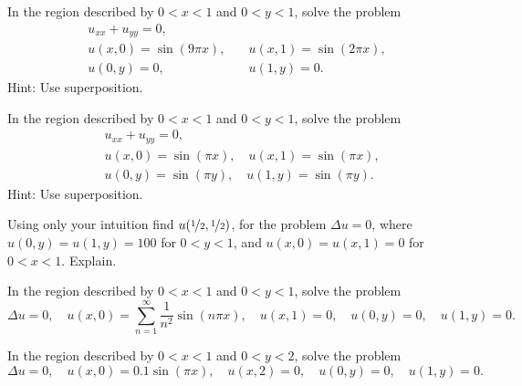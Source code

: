 \begin{exercise}
In the region described by $0 < x < 1$ and $0 < y < 1$,
solve the problem
\begin{equation*}
\begin{array}{ll}
u_{xx} + u_{yy} = 0, & \\
u(x,0) = \sin (9 \pi x), \quad & u(x,1) = \sin (2 \pi x), \\
u(0,y) = 0, \quad & u(1,y) = 0 .
\end{array}
\end{equation*}
Hint: Use superposition.
\end{exercise}

\begin{exercise}
In the region described by $0 < x < 1$ and $0 < y < 1$,
solve the problem
\begin{align*}
& u_{xx} + u_{yy} = 0, \\
& u(x,0) = \sin (\pi x), \quad u(x,1) = \sin (\pi x), \\
& u(0,y) = \sin (\pi y), \quad u(1,y) = \sin (\pi y) .
\end{align*}
Hint: Use superposition.
\end{exercise}

\begin{exercise}[challenging]
Using only your intuition find $u(\nicefrac{1}{2},\nicefrac{1}{2})$,
for the problem
$\Delta u = 0$, where $u(0,y) = u(1,y) = 100$ for $0 < y < 1$, and
$u(x,0) = u(x,1) = 0$ for $0 < x < 1$.  Explain.
\end{exercise}

\setcounter{exercise}{100}

\begin{exercise}
In the region described by $0 < x < 1$ and $0 < y < 1$,
solve the problem
\begin{equation*}
\Delta u = 0, \quad u(x,0) = \sum_{n=1}^\infty \frac{1}{n^2} \sin (n \pi x),
\quad u(x,1) = 0,
\quad u(0,y) = 0, 
\quad u(1,y) = 0 .
\end{equation*}
\end{exercise}

\begin{exercise}
In the region described by $0 < x < 1$ and $0 < y < 2$,
solve the problem
\begin{equation*}
\Delta u = 0, \quad u(x,0) = 0.1 \sin (\pi x),
\quad u(x,2) = 0,
\quad u(0,y) = 0, 
\quad u(1,y) = 0 .
\end{equation*}
\end{exercise}

